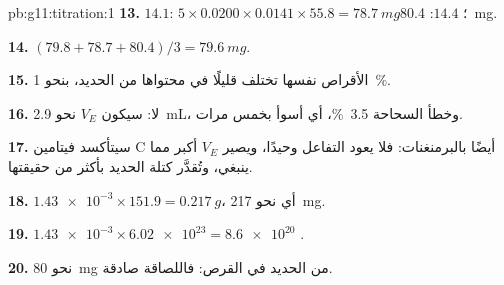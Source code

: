 \begin{solution}{pb:g11:titration:1}
\textbf{13.} $14.1$: $5 \times 0.0200 \times 0.0141 \times 55.8 =
\qty{78.7}{mg}$؛ $14.4$: \qty{80.4}{mg}.

\textbf{14.} $(79.8 + 78.7 + 80.4)/3 = \qty{79.6}{mg}$.

\textbf{15.} الأقراص نفسها تختلف قليلًا في محتواها من
الحديد، بنحو \qty{1}{\percent}.

\textbf{16.} لا: سيكون $V_E$ نحو \qty{2.9}{mL}، وخطأ السحاحة
\qty{3.5}{\percent}، أي أسوأ بخمس مرات.

\textbf{17.} سيتأكسد فيتامين C أيضًا بالبرمنغنات: فلا يعود
التفاعل وحيدًا، ويصير $V_E$ أكبر مما ينبغي، وتُقدَّر كتلة
الحديد بأكثر من حقيقتها.

\textbf{18.} $\num{1.43e-3} \times 151.9 = \qty{0.217}{g}$، أي نحو
\qty{217}{mg}.

\textbf{19.} $\num{1.43e-3} \times \num{6.02e23} = \num{8.6e20}$ .

\textbf{20.} نحو \qty{80}{mg} من الحديد في القرص: فاللصاقة
صادقة.
\end{solution}
